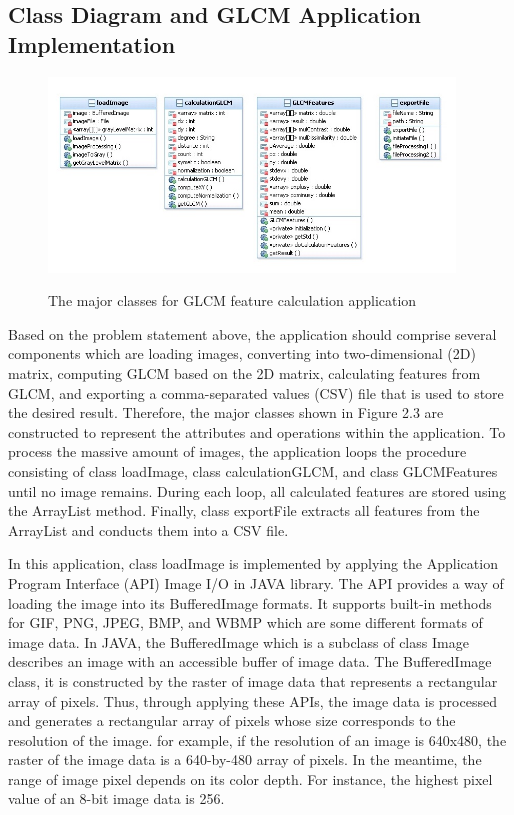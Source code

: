 \subsection{Class Diagram and GLCM Application Implementation}
\begin{figure}[!h]
\begin{center}
\includegraphics[width=4.25in]{class_diagram}
\end{center}
\renewcommand{\baselinestretch}{1}
\small\normalsize
\begin{quote}
\caption{The major classes for GLCM feature calculation application}
\label{fig2.2}
\end{quote}
\end{figure}
\renewcommand{\baselinestretch}{2}
\small\normalsize
Based on the problem statement above, the application should comprise several components which are loading images, converting into two-dimensional (2D) matrix, computing GLCM based on the 2D matrix, calculating features from GLCM, and exporting a comma-separated values (CSV) file that is used to store the desired result. Therefore, the major classes shown in Figure 2.3 are constructed to represent the attributes and operations within the application. To process the massive amount of images, the application loops the procedure consisting of class loadImage, class calculationGLCM, and class GLCMFeatures until no image remains. During each loop, all calculated features are stored using the ArrayList method. Finally, class exportFile extracts all features from the ArrayList and conducts them into a CSV file.\par
In this application, class loadImage is implemented by applying the Application Program Interface (API) Image I/O in JAVA library. The API provides a way of loading the image into its BufferedImage formats. It supports built-in methods for GIF, PNG, JPEG, BMP, and WBMP which are some different formats of image data. In JAVA, the BufferedImage which is a subclass of class Image describes an image with an accessible buffer of image data. The BufferedImage class, it is constructed by the raster of image data that represents a rectangular array of pixels. Thus, through applying these APIs, the image data is processed and generates a rectangular array of pixels whose size corresponds to the resolution of the image. for example, if the resolution of an image is 640x480, the raster of the image data is a 640-by-480 array of pixels. In the meantime, the range of image pixel depends on its color depth. For instance, the highest pixel value of an 8-bit image data is 256. \par
